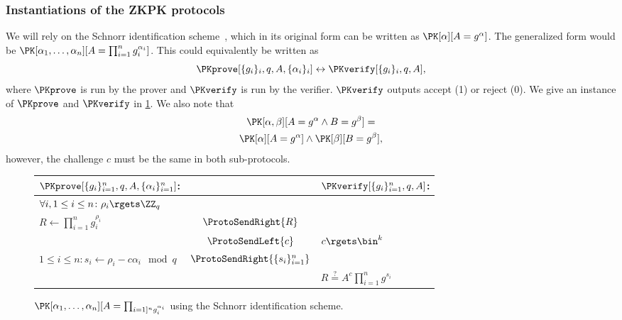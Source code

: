 \subsubsection{Instantiations of the \acs{ZKPK} protocols}


We will rely on the Schnorr identification scheme~\cite{Schnorr}, which in its 
original form can be written as \(\PK[\alpha][A = g^\alpha]\).
The generalized form would be \(\PK[\alpha_1, \dotsc, \alpha_n][A = 
    \prod_{i=1}^n g_i^{\alpha_i}]\).
This could equivalently be written as
\begin{equation*}
  \PKprove[\{g_i\}_i, q, A, \{\alpha_i\}_i] \leftrightarrow
  \PKverify[\{g_i\}_i, q, A],
\end{equation*}
where \(\PKprove\) is run by the prover and \(\PKverify\) is run by the 
verifier.
\(\PKverify\) outputs accept (1) or reject (0).
We give an instance of \(\PKprove\) and \(\PKverify\) in \cref{PKalgorithms}.
We also note that
\begin{multline*}
  \PK[\alpha, \beta][A = g^\alpha \land B = g^\beta] = \\
  \PK[\alpha][A = g^\alpha] \land \PK[\beta][B = g^\beta],
\end{multline*}
however, the challenge \(c\) must be the same in both sub-protocols.

\begin{figure*}
  \centering
  \begin{tabular}{lcl}
    \(\PKprove[\{g_i\}_{i=1}^n, q, A, \{\alpha_i\}_{i=1}^n]\):
    &
    & \(\PKverify[\{g_i\}_{i=1}^n, q, A]\):
    \\
    \midrule

    \(\forall i, 1\leq i\leq n\colon \rho_i\rgets \ZZ_q\)
    &
    &
    \\

    \(R\gets \prod_{i=1}^n g_i^{\rho_i}\)
    & \(\ProtoSendRight{R}\)
    &
    \\

    & \(\ProtoSendLeft{c}\)
    & \(c\rgets \bin^k\)
    \\

    \(1\leq i\leq n\colon s_i\gets \rho_i - c\alpha_i \mod q\)
    & \(\ProtoSendRight{\{s_i\}_{i=1}^n}\)
    &
    \\

    &
    & \(R \stackrel{?}{=} A^c \prod_{i=1}^n g^{s_i}\)
    \\
    
  \end{tabular}
  \caption{%
    \(\PK[\alpha_1, \dotsc, \alpha_n][A = \prod_{i=1]^n g_i^{\alpha_i}}\) using 
    the Schnorr identification scheme.
  }%
  \label{PKalgorithms}
\end{figure*}

